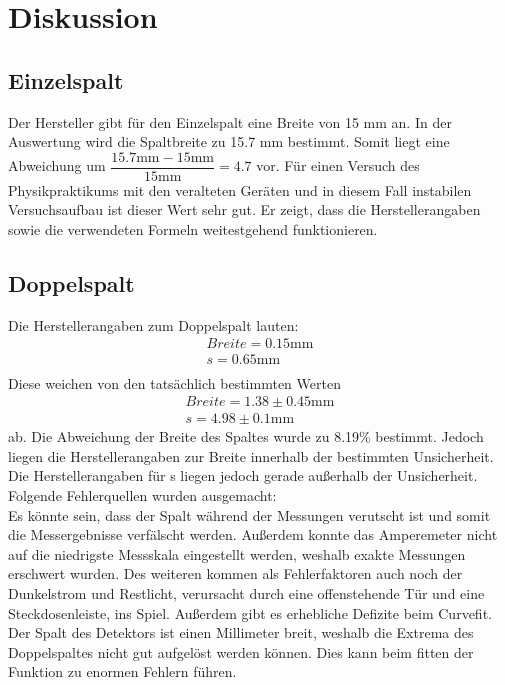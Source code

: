 \section{Diskussion}
\label{sec:Diskussion}

\subsection{Einzelspalt}
    Der Hersteller gibt für den Einzelspalt eine Breite von 15 mm an. In der Auswertung wird
    die Spaltbreite zu 15.7 mm bestimmt. Somit liegt eine Abweichung um $\dfrac{15.7 \si{\milli\metre} 
    - 15 \si{\milli\metre}}{15 \si{\milli\metre}} = 4.7 $ vor. Für einen Versuch des Physikpraktikums mit den veralteten Geräten 
    und in diesem Fall instabilen Versuchsaufbau ist dieser Wert sehr gut. Er zeigt, dass die 
    Herstellerangaben sowie die verwendeten Formeln weitestgehend funktionieren.
    
\subsection{Doppelspalt}
    Die Herstellerangaben zum Doppelspalt lauten:
    \begin{align*}
        Breite = 0.15 \si{\milli\metre}\\
        s = 0.65 \si{\milli\metre}\\
    \end{align*}
    Diese weichen von den tatsächlich bestimmten Werten 
    \begin{align*}
        Breite = 1.38 \pm 0.45 \si{\milli\metre}\\
        s = 4.98 \pm 0.1 \si{\milli\metre}
    \end{align*}
    ab. Die Abweichung der Breite des Spaltes wurde zu 8.19\% bestimmt. Jedoch liegen
    die Herstellerangaben zur Breite innerhalb der bestimmten Unsicherheit. Die
    Herstellerangaben für s liegen jedoch gerade außerhalb der Unsicherheit. Folgende 
    Fehlerquellen wurden ausgemacht:\\
    Es könnte sein, dass 
    der Spalt während der Messungen verutscht ist und somit die Messergebnisse verfälscht werden.
    Außerdem konnte das Amperemeter nicht auf die niedrigste Messskala eingestellt werden, weshalb
    exakte Messungen erschwert wurden. Des weiteren kommen als Fehlerfaktoren auch noch der 
    Dunkelstrom und Restlicht, verursacht durch eine offenstehende Tür und eine Steckdosenleiste, 
    ins Spiel.
    Außerdem gibt es erhebliche Defizite beim Curvefit. Der Spalt des Detektors ist einen Millimeter 
    breit, weshalb die Extrema des Doppelspaltes nicht gut aufgelöst werden können. Dies kann beim 
    fitten der Funktion zu enormen Fehlern führen.


